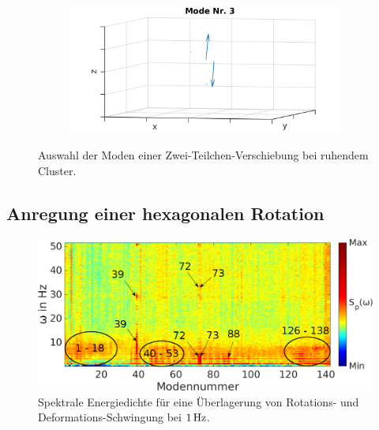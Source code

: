 \documentclass[numbers=noenddot,a4paper,notitlepage,twoside,BCOR15mm]{scrbook}
\begin{document}
\begin{figure}[!t]
\begin{subfigure}[t]{0.325\textwidth}
									\includegraphics[width=\textwidth,height=0.7\textwidth]{figs/auswertung/manipulation/dipol3HzModeNr3.png}
								\end{subfigure}
								\caption{Auswahl der Moden einer Zwei-Teilchen-Verschiebung bei ruhendem Cluster.}\label{img:modendipol3Hz}
							\end{figure}

						\subsection*{Anregung einer hexagonalen Rotation}

								\begin{figure}[!b]
									\centering
									\includegraphics[width=\textwidth]{figs/auswertung/manipulation/rotdipol1Hzpowerdens.png}
									\caption{Spektrale Energiedichte für eine Überlagerung von Rotations- und Deformations-Schwingung bei $\unit[1]{Hz}$.}\label{img:rotdipol1Hzpowerdens}
								\end{figure}
\end{document}

